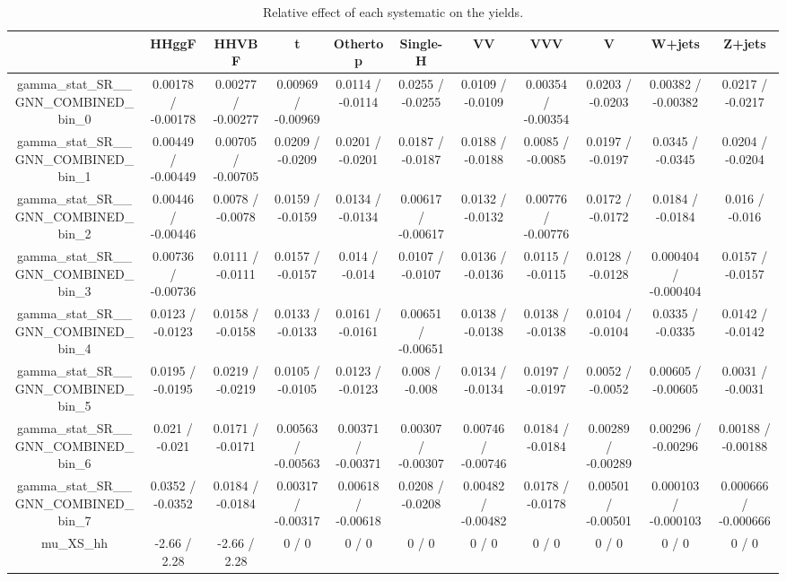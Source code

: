 \documentclass[10pt]{article}
\begin{document}
\begin{table}[htbp]
\begin{center}
\begin{tabular}{|c|c|c|c|c|c|c|c|c|c|c|}
\hline 
      & HHggF      & HHVBF      & t      & Othertop      & Single-H      & VV      & VVV      & V      & W+jets      & Z+jets \\ 
\hline 
  gamma_stat_SR__GNN_COMBINED_bin_0 & 0.00178 / -0.00178 & 0.00277 / -0.00277 & 0.00969 / -0.00969 & 0.0114 / -0.0114 & 0.0255 / -0.0255 & 0.0109 / -0.0109 & 0.00354 / -0.00354 & 0.0203 / -0.0203 & 0.00382 / -0.00382 & 0.0217 / -0.0217 \\ 
  gamma_stat_SR__GNN_COMBINED_bin_1 & 0.00449 / -0.00449 & 0.00705 / -0.00705 & 0.0209 / -0.0209 & 0.0201 / -0.0201 & 0.0187 / -0.0187 & 0.0188 / -0.0188 & 0.0085 / -0.0085 & 0.0197 / -0.0197 & 0.0345 / -0.0345 & 0.0204 / -0.0204 \\ 
  gamma_stat_SR__GNN_COMBINED_bin_2 & 0.00446 / -0.00446 & 0.0078 / -0.0078 & 0.0159 / -0.0159 & 0.0134 / -0.0134 & 0.00617 / -0.00617 & 0.0132 / -0.0132 & 0.00776 / -0.00776 & 0.0172 / -0.0172 & 0.0184 / -0.0184 & 0.016 / -0.016 \\ 
  gamma_stat_SR__GNN_COMBINED_bin_3 & 0.00736 / -0.00736 & 0.0111 / -0.0111 & 0.0157 / -0.0157 & 0.014 / -0.014 & 0.0107 / -0.0107 & 0.0136 / -0.0136 & 0.0115 / -0.0115 & 0.0128 / -0.0128 & 0.000404 / -0.000404 & 0.0157 / -0.0157 \\ 
  gamma_stat_SR__GNN_COMBINED_bin_4 & 0.0123 / -0.0123 & 0.0158 / -0.0158 & 0.0133 / -0.0133 & 0.0161 / -0.0161 & 0.00651 / -0.00651 & 0.0138 / -0.0138 & 0.0138 / -0.0138 & 0.0104 / -0.0104 & 0.0335 / -0.0335 & 0.0142 / -0.0142 \\ 
  gamma_stat_SR__GNN_COMBINED_bin_5 & 0.0195 / -0.0195 & 0.0219 / -0.0219 & 0.0105 / -0.0105 & 0.0123 / -0.0123 & 0.008 / -0.008 & 0.0134 / -0.0134 & 0.0197 / -0.0197 & 0.0052 / -0.0052 & 0.00605 / -0.00605 & 0.0031 / -0.0031 \\ 
  gamma_stat_SR__GNN_COMBINED_bin_6 & 0.021 / -0.021 & 0.0171 / -0.0171 & 0.00563 / -0.00563 & 0.00371 / -0.00371 & 0.00307 / -0.00307 & 0.00746 / -0.00746 & 0.0184 / -0.0184 & 0.00289 / -0.00289 & 0.00296 / -0.00296 & 0.00188 / -0.00188 \\ 
  gamma_stat_SR__GNN_COMBINED_bin_7 & 0.0352 / -0.0352 & 0.0184 / -0.0184 & 0.00317 / -0.00317 & 0.00618 / -0.00618 & 0.0208 / -0.0208 & 0.00482 / -0.00482 & 0.0178 / -0.0178 & 0.00501 / -0.00501 & 0.000103 / -0.000103 & 0.000666 / -0.000666 \\ 
  mu_XS_hh & -2.66 / 2.28 & -2.66 / 2.28 & 0 / 0 & 0 / 0 & 0 / 0 & 0 / 0 & 0 / 0 & 0 / 0 & 0 / 0 & 0 / 0 \\ 
\hline 
\end{tabular} 
\caption{Relative effect of each systematic on the yields.} 
\end{center} 
\end{table} 
\end{document}
